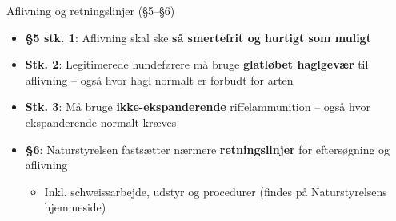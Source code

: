 \begin{frame}{Aflivning og retningslinjer (§5–§6)}
    \begin{itemize}
        \item \textbf{§5 stk. 1}: Aflivning skal ske \textbf{så smertefrit og hurtigt som muligt}
        \item \textbf{Stk. 2}: Legitimerede hundeførere må bruge \textbf{glatløbet haglgevær} til aflivning – også hvor hagl normalt er forbudt for arten
        \item \textbf{Stk. 3}: Må bruge \textbf{ikke-ekspanderende} riffelammunition – også hvor ekspanderende normalt kræves
        \item \textbf{§6}: Naturstyrelsen fastsætter nærmere \textbf{retningslinjer} for eftersøgning og aflivning
          \begin{itemize}
            \item Inkl. schweissarbejde, udstyr og procedurer (findes på Naturstyrelsens hjemmeside)
          \end{itemize}
    \end{itemize}
\end{frame}